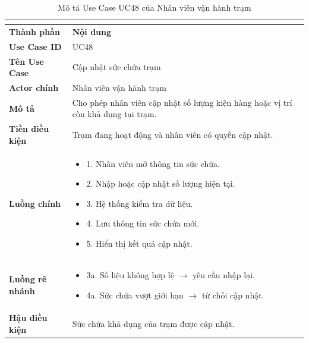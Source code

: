 \begin{longtable}{|C{3cm}|L{11cm}|}
\caption{Mô tả Use Case UC48 của Nhân viên vận hành trạm}\\
\label{tab:mo-ta-uc48-van-hanh-tram}\\
\hline
\textbf{Thành phần} & \textbf{Nội dung} \\
\hline
\textbf{Use Case ID} & UC48 \\
\hline
\textbf{Tên Use Case} & Cập nhật sức chứa trạm \\
\hline
\textbf{Actor chính} & Nhân viên vận hành trạm \\
\hline
\textbf{Mô tả} &
Cho phép nhân viên cập nhật số lượng kiện hàng hoặc vị trí còn khả dụng tại trạm.
\\
\hline
\textbf{Tiền điều kiện} &
Trạm đang hoạt động và nhân viên có quyền cập nhật.
\\
\hline
\textbf{Luồng chính} &
\begin{itemize}[leftmargin=*,topsep=2pt,itemsep=2pt]
    \item 1. Nhân viên mở thông tin sức chứa.
    \item 2. Nhập hoặc cập nhật số lượng hiện tại.
    \item 3. Hệ thống kiểm tra dữ liệu.
    \item 4. Lưu thông tin sức chứa mới.
    \item 5. Hiển thị kết quả cập nhật.
\end{itemize}
\\
\hline
\textbf{Luồng rẽ nhánh} &
\begin{itemize}[leftmargin=*,topsep=2pt,itemsep=2pt]
    \item 3a. Số liệu không hợp lệ $\rightarrow$ yêu cầu nhập lại.
    \item 4a. Sức chứa vượt giới hạn $\rightarrow$ từ chối cập nhật.
\end{itemize}
\\
\hline
\textbf{Hậu điều kiện} &
Sức chứa khả dụng của trạm được cập nhật.
\\
\hline
\end{longtable}


